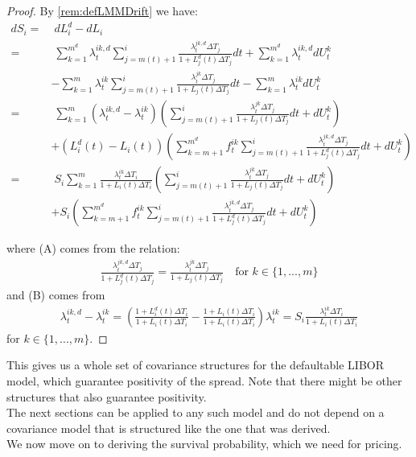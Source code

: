 \documentclass[12pt]{article}
\begin{document}
	\begin{proof}
		By \cref{rem:defLMMDrift} we have:
		\begin{align*}
			dS_i =&\; dL^d_i - dL_i\\
			=&\; \sum_{k=1}^{m^d}\lambda^{i k,d}_t \sum_{j=m(t)+1}^{i}\frac{\lambda^{j k,d}_t \Delta T_j}{1 + L^d_j(t) \Delta T_j} dt + \sum_{k=1}^{m^d}\lambda^{i k,d}_tdU^k_t 
			\\
			&- \sum_{k=1}^{m}\lambda^{i k}_t \sum_{j=m(t)+1}^{i}\frac{\lambda^{j k}_t \Delta T_j}{1 + L_j(t) \Delta T_j} dt - \sum_{k=1}^{m}\lambda^{i k}_t dU^k_t\\
			=&\; \sum_{k=1}^{m}\left(\lambda^{i k,d}_t - \lambda^{i k}_t\right)\left( \sum_{j=m(t)+1}^{i}\frac{\lambda^{j k}_t \Delta T_j}{1 + L_j(t) \Delta T_j} dt + dU^k_t\right)
			\tag{A}\\
			&+ \left(L^d_i(t) - L_i(t)\right)\left(\sum_{k=m + 1}^{m^d}f^{i k}_t \sum_{j=m(t)+1}^{i}\frac{\lambda^{j k, d}_t \Delta T_j}{1 + L^d_j(t) \Delta T_j} dt + dU^k_t\right)\\
			=&\; S_i\sum_{k=1}^{m}\frac{\lambda^{i k}_t \Delta T_i}{1 + L_i(t)\Delta T_i}\left( \sum_{j=m(t)+1}^{i}\frac{\lambda^{j k}_t \Delta T_j}{1 + L_j(t) \Delta T_j} dt + dU^k_t\right)
			\tag{B}\\
			&+ S_i\left(\sum_{k=m + 1}^{m^d}f^{i k}_t \sum_{j=m(t)+1}^{i}\frac{\lambda^{j k, d}_t \Delta T_j}{1 + L^d_j(t) \Delta T_j} dt + dU^k_t\right)
		\end{align*}
		
		where (A) comes from the relation:
		\begin{align*}
			\frac{\lambda^{j k, d}_t \Delta T_j}{1 + L^d_j(t) \Delta T_j} = \frac{\lambda^{j k}_t \Delta T_j}{1 + L_j(t) \Delta T_j} \quad \text{for } k \in \{1, ..., m\}
		\end{align*}
		and (B) comes from
		\begin{align*}
			\lambda^{i k,d}_t - \lambda^{i k}_t = \left(\frac{1 + L^d_i(t) \Delta T_i}{1 + L_i(t)\Delta T_i} - \frac{1 + L_i(t) \Delta T_i}{1 + L_i(t)\Delta T_i}\right)\lambda^{i k}_t = S_i \frac{\lambda^{i k}_t \Delta T_i}{1 + L_i(t) \Delta T_i}
		\end{align*}
		for $k \in \{1, ..., m\}$.
	\end{proof}
	
	This gives us a whole set of covariance structures for the defaultable LIBOR model, which guarantee positivity of the spread. Note that there might be other structures that also guarantee positivity.\\
	The next sections can be applied to any such model and do not depend on a covariance model that is structured like the one that was derived.\\
	We now move on to deriving the survival probability, which we need for pricing.
	
\end{document}
